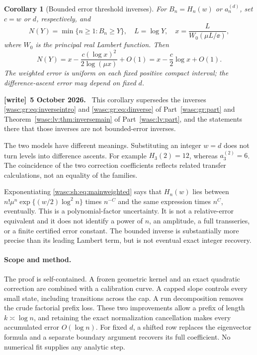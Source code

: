 \documentclass[11pt,a4paper]{article}
\newtheorem{corollary}[theorem]{Corollary}
\theoremstyle{remark}\newtheorem{remark}[theorem]{Remark}
\numberwithin{equation}{section}
\newenvironment{writenote}[1][]{\par\smallskip\begingroup\small
 \noindent\textbf{[write]}\if\relax\detokenize{#1}\relax\else~\textbf{#1.}\fi\ }%
 {\par\endgroup\smallskip}
\begin{document}
\begin{corollary}[Bounded error threshold inverses]\label{wasc:sh:cor:inverse}
For $B_n=H_n(w)$ or $a_n^{(d)}$, set $c=w$ or $d$, respectively, and
\[
N(Y)=\min\{n\ge1:B_n\ge Y\},\quad L=\log Y,\quad
x=\frac{L}{W_0(\mu L/\ee)},
\]
where $W_0$ is the principal real Lambert function. Then
\begin{equation}\label{wasc:sh:eq:maininverse}
N(Y)=x-\frac{c(\log x)^2}{2\log(\mu x)}+O(1)
=x-\frac c2\log x+O(1).
\end{equation}
The weighted error is uniform on each fixed positive compact interval; the difference-ascent error may depend on fixed $d$.
\end{corollary}
\begin{writenote}[5 October 2026]
This corollary supersedes the inverses \eqref{wasc:gr:eq:inverseintro} and \eqref{wasc:gr:eq:dinverse} of Part~\ref{wasc:gr:part} and Theorem~\ref{wasc:lv:thm:inversemain} of Part~\ref{wasc:lv:part}, and the statements there that those inverses are not bounded-error inverses.
\end{writenote}

The two models have different meanings. Substituting an integer $w=d$ does not turn levels into difference ascents. For example $H_3(2)=12$, whereas $a_3^{(2)}=6$. The coincidence of the two correction coefficients reflects related transfer calculations, not an equality of the families.

Exponentiating \eqref{wasc:sh:eq:mainweighted} says that $H_n(w)$ lies between
$n!\mu^n\exp\{(w/2)\log^2 n\}$ times $n^{-C}$ and the same expression times $n^C$, eventually. This is a polynomial-factor uncertainty. It is not a relative-error equivalent and it does not identify a power of $n$, an amplitude, a full transseries, or a finite certified error constant. The bounded inverse is substantially more precise than its leading Lambert term, but is not eventual exact integer recovery.

\paragraph{Scope and method.}
The proof is self-contained. A frozen geometric kernel and an exact quadratic correction are combined with a calibration curve. A capped slope controls every small state, including transitions across the cap. A run decomposition removes the crude factorial prefix loss. These two improvements allow a prefix of length $k\asymp\log n$, and retaining the exact normalization cancellation makes every accumulated error $O(\log n)$. For fixed $d$, a shifted row replaces the eigenvector formula and a separate boundary argument recovers its full coefficient. No numerical fit supplies any analytic step.
\end{document}
